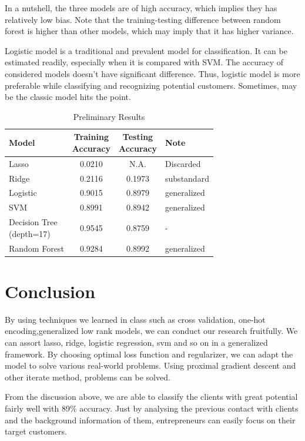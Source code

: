 \documentclass{mytemplate}%
\begin{document}
\begin{multicols}{2}
In a nutshell, the three models are of high accuracy, which implies they has relatively low bias. Note that the training-testing difference between random forest is higher than other models, which may imply that it has higher variance.

Logistic model is a traditional and prevalent model for classification. It can be estimated readily, especially when it is compared with SVM. The accuracy of considered models doesn't have significant difference. Thus, logistic model is more preferable while classifying and recognizing potential customers. Sometimes, may be the classic model hits the point.

\begin{table}[H]%
  \centering
  \begin{tabular}{|l|c|c|l|}
     \hline
 Model   & \makecell[tl]{Training \\Accuracy} & \makecell[tl]{Testing\\ Accuracy} &Note\\ \hline
Lasso & 0.0210 &N.A. & Discarded\\ \hline
Ridge & 0.2116&0.1973&substandard\\ \hline
 Logistic & 0.9015 &  0.8979& generalized\\ \hline
 SVM & 0.8991 & 0.8942&generalized\\ \hline
\makecell[tl]{Decision Tree\\(depth=17)} &0.9545 &0.8759&-\\ \hline
Random Forest& 0.9284 & 0.8992&generalized\\ \hline
   \end{tabular}
  \caption{Preliminary Results}\label{T02}
\end{table}


\section{\color{blue}Conclusion}
By using techniques we learned in class such as cross validation, one-hot encoding,generalized low rank models, we can conduct our research fruitfully. 
We can assort lasso, ridge, logistic regression, svm and so on in a generalized framework. By choosing optimal loss function and regularizer, we can adapt the model to solve various real-world problems. Using proximal gradient descent and other iterate method, problems can be solved.

From the discussion above, we are able to classify the clients with great potential fairly well with 89\% accuracy. Just by analysing the previous contact with clients and the background information of them, entrepreneurs can easily focus on their target customers.


\end{multicols}
\end{document}
